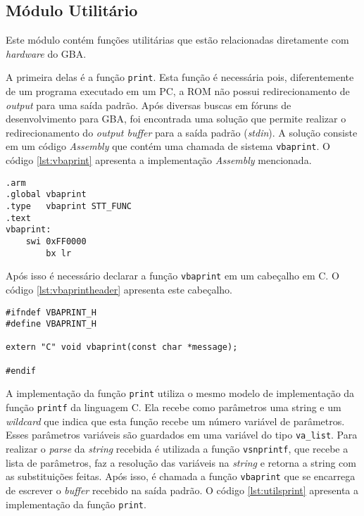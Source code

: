 \subsection{Módulo Utilitário}

Este módulo contém funções utilitárias que estão relacionadas diretamente com \textit{hardware} do GBA.

A primeira delas é a função \texttt{print}. Esta função é necessária pois, diferentemente de um programa executado em um PC, a ROM não possui redirecionamento de \textit{output} para uma saída padrão. Após diversas buscas em fóruns de desenvolvimento para GBA, foi encontrada uma solução que permite realizar o redirecionamento do \textit{output buffer} para a saída padrão (\textit{stdin}). A solução consiste em um código \textit{Assembly} que contém uma chamada de sistema \texttt{vbaprint}. O código \ref{lst:vbaprint} apresenta a implementação \textit{Assembly} mencionada.

\begin{lstlisting}[label={lst:vbaprint}, caption={Código \textit{Assembly} para a função \texttt{vbaprint}}]
.arm
.global vbaprint
.type   vbaprint STT_FUNC
.text
vbaprint:
    swi 0xFF0000
        bx lr
\end{lstlisting}

Após isso é necessário declarar a função \texttt{vbaprint} em um cabeçalho em C. O código \ref{lst:vbaprintheader} apresenta este cabeçalho.

\begin{lstlisting}[label={lst:vbaprintheader}, caption={Cabeçalho da função \texttt{vbaprint}}]
#ifndef VBAPRINT_H
#define VBAPRINT_H

extern "C" void vbaprint(const char *message);

#endif
\end{lstlisting}

A implementação da função \texttt{print} utiliza o mesmo modelo de implementação da função \texttt{printf} da linguagem C. Ela recebe como parâmetros uma string e um \textit{wildcard} que indica que esta função recebe um número variável de parâmetros. Esses parâmetros variáveis são guardados em uma variável do tipo \texttt{va\_list}. Para realizar o \textit{parse} da \textit{string} recebida é utilizada a função \texttt{vsnprintf}, que recebe a lista de parâmetros, faz a resolução das variáveis na \textit{string} e retorna a string com as substituições feitas. Após isso, é chamada a função \texttt{vbaprint} que se encarrega de escrever o \textit{buffer} recebido na saída padrão. O código \ref{lst:utilsprint} apresenta a implementação da função \texttt{print}.

